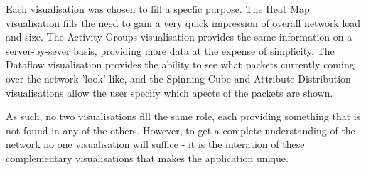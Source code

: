 Each visualisation was chosen to fill a specfic purpose.  The Heat Map visualisation fills the need to gain a very quick impression of overall network load and size.  The Activity Groups visualisation provides the same information on a server-by-sever basis, providing more data at the expense of simplicity.  The Dataflow visualisation provides the ability to see what packets currently coming over the network 'look' like, and the Spinning Cube and Attribute Distribution visualisations allow the user specify which apects of the packets are shown.

As such, no two visualisations fill the same role, each providing something that is not found in any of the others.  However, to get a complete understanding of the network no one visualisation will suffice - it is the interation of these complementary visualisations that makes the application unique.